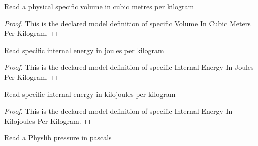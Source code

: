 \begin{definition}
  \label{def:physics:phyx-mini-0462:phyxminiproblems-problemphyxmini0462-specificvolumeincubicmetersperkilogram}
  Read a physical specific volume in cubic metres per kilogram
\end{definition}
\begin{proof}
  This is the declared model definition of specific Volume In Cubic Meters Per Kilogram.
\end{proof}
\begin{definition}
  \label{def:physics:phyx-mini-0462:phyxminiproblems-problemphyxmini0462-specificinternalenergyinjoulesperkilogram}
  Read specific internal energy in joules per kilogram
\end{definition}
\begin{proof}
  This is the declared model definition of specific Internal Energy In Joules Per Kilogram.
\end{proof}
\begin{definition}
  \label{def:physics:phyx-mini-0462:phyxminiproblems-problemphyxmini0462-specificinternalenergyinkilojoulesperkilogram}
  Read specific internal energy in kilojoules per kilogram
\end{definition}
\begin{proof}
  This is the declared model definition of specific Internal Energy In Kilojoules Per Kilogram.
\end{proof}
\begin{definition}
  \label{def:physics:phyx-mini-0462:phyxminiproblems-problemphyxmini0462-pressureinpascals}
  Read a Physlib pressure in pascals
\end{definition}

